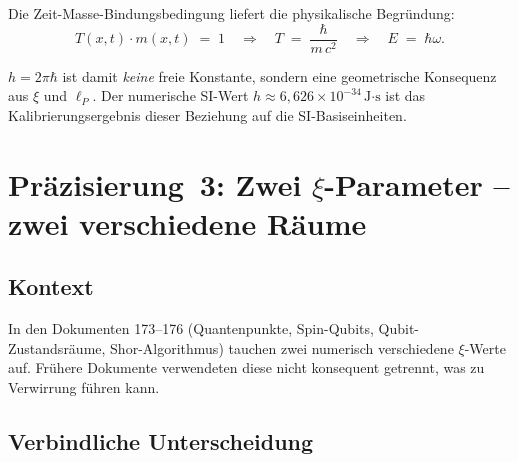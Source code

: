 Die Zeit-Masse-Bindungsbedingung liefert die physikalische Begründung:
\begin{equation}
  T(x,t)\cdot m(x,t) \;=\; 1
  \quad\Longrightarrow\quad
  T \;=\; \frac{\hbar}{m\, c^2}
  \quad\Longrightarrow\quad
  E \;=\; \hbar\omega.
  \tag{190.9}
\end{equation}

$h = 2\pi\hbar$ ist damit \emph{keine} freie Konstante, sondern eine
geometrische Konsequenz aus $\xi$ und $\ell_P$. Der numerische SI-Wert
$h \approx 6{,}626 \times 10^{-34}\,\text{J·s}$ ist das
Kalibrierungsergebnis dieser Beziehung auf die SI-Basiseinheiten.

\section{\texorpdfstring{Präzisierung~3: Zwei $\xi$-Parameter -- zwei verschiedene Räume}{Praezisierung 3: Zwei xi-Parameter -- zwei verschiedene Raeume}}

\subsection*{Kontext}

In den Dokumenten 173--176 (Quantenpunkte, Spin-Qubits, Qubit-Zustandsräume,
Shor-Algorithmus) tauchen zwei numerisch verschiedene $\xi$-Werte auf.
Frühere Dokumente verwendeten diese nicht konsequent getrennt, was zu
Verwirrung führen kann.

\subsection*{Verbindliche Unterscheidung}

\begin{center}
{\footnotesize
{}
}
\end{center}

